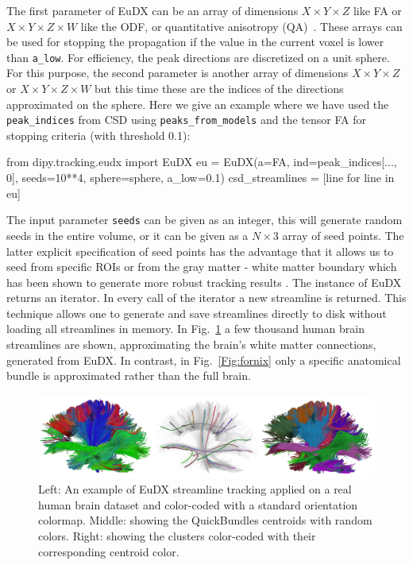 \documentclass{bioinfo}
\begin{document}
The first parameter of EuDX can be an array of dimensions $X\times Y\times Z$
like FA or $X\times Y\times Z \times W$ like the ODF, or quantitative
anisotropy (QA)~\citep{yeh-etal:10}. These arrays can be used for stopping the
propagation if the value in the current voxel is lower than
\texttt{a\_low}. For efficiency, the peak directions are discretized on a unit
sphere. For this purpose, the second parameter is another array of dimensions
$X\times Y\times Z$ or $X\times Y\times Z\times W$ but this time these are the
indices of the directions approximated on the sphere. Here we give an example
where we have used the \texttt{peak\_indices} from CSD using \texttt{peaks\_from\_models}
and the tensor FA for stopping criteria (with threshold 0.1):
\begin{python}
from dipy.tracking.eudx import EuDX
eu = EuDX(a=FA, ind=peak_indices[..., 0],
          seeds=10**4, sphere=sphere, a_low=0.1)
csd_streamlines = [line for line in eu]
\end{python}
The input parameter \texttt{seeds} can be given as an integer, this will
generate random seeds in the entire volume, or it can be given as a $N\times 3$
array of seed points. The latter explicit specification of seed points has the
advantage that it allows us to seed from specific ROIs or from the gray matter
- white matter boundary which has been shown to generate more robust tracking
results \citep{Cote2013tractometer}. The instance of EuDX returns an
iterator. In every call of the iterator a new streamline is returned. This
technique allows one to generate and save streamlines directly to disk without loading all
streamlines in memory. In Fig.~\ref{Fig:pretty_streamlines} a few thousand
human brain streamlines are shown, approximating the brain's white matter connections,
generated from EuDX. In contrast, in Fig.~\ref{Fig:fornix} only a specific anatomical bundle is
approximated rather than the full brain.

\begin{figure}[!htb]
\includegraphics[scale=0.46]{Figures/qb.jpg}
\centering{}
\caption{Left: An example of EuDX streamline tracking applied on a real
  human brain dataset and color-coded with a standard orientation colormap.
  Middle: showing the QuickBundles centroids with random colors. Right: showing
  the clusters color-coded with their corresponding centroid color.
  \label{Fig:pretty_streamlines}}
\end{figure}
\end{document}
